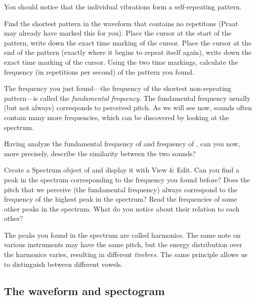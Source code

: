 \documentclass[a4paper, 9pt]{article}
\begin{document}
\newpage
\noindent You should notice that the individual vibrations form a self-repeating
pattern.

\begin{exercise}
\action Find the shortest pattern in the waveform that contains no repetitons (Praat may already have marked this for you).
\action Place the cursor at the start of the pattern, write down the exact time marking of the cursor. 
\action Place the cursor at the end of the pattern (exactly where it begins to repeat itself again), write down the exact time marking of the cursor. 
\ask Using the two time markings, calculate the frequency (in repetitions per second) of the pattern you found. 
\end{exercise}

The frequency you just found---the frequency of the shortest
non-repeating pattern---is called the \emph{fundamental frequency}. The
fundamental frequency usually (but not always) corresponds to perceived
pitch. As we will see now, sounds often contain many more frequencies,
which can be discovered by looking at the spectrum.

\begin{exercise}
\ask Having analyze the fundamental frequency of  and frequency of , can you now, more precisely, describe the similarity between the two sounds?
\end{exercise}

\begin{exercise}
\action Create a Spectrum object of  and display it with View \& Edit. 
\action Can you find a peak in the spectrum corresponding to the frequency you found before?  
\askstar Does the pitch that we perceive (the fundamental frequency) always correspond to the frequency of the highest peak in the spectrum? 
\action Read the frequencies of some other peaks in the spectrum. What do you notice about their relation to each other?
\end{exercise}

The peaks you found in the spectrum are called harmonics. The same note
on various instruments may have the same pitch, but the energy
distribution over the harmonics varies, resulting in different
\emph{timbres}. The same principle allows us to distinguish between
different vowels.


\subsection{The waveform and
spectogram}\label{the-waveform-and-spectogram}
\end{document}
